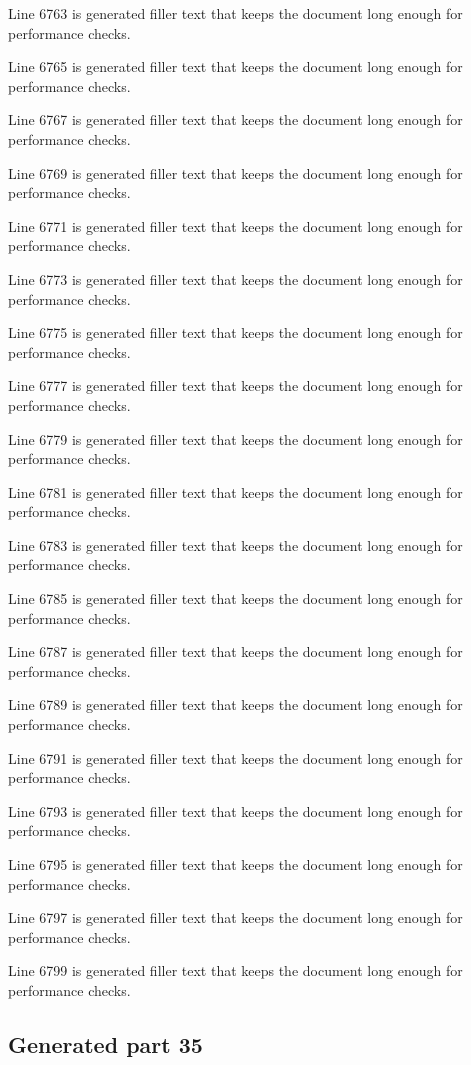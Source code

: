 Line 6763 is generated filler text that keeps the document long enough for performance checks.

Line 6765 is generated filler text that keeps the document long enough for performance checks.

Line 6767 is generated filler text that keeps the document long enough for performance checks.

Line 6769 is generated filler text that keeps the document long enough for performance checks.

Line 6771 is generated filler text that keeps the document long enough for performance checks.

Line 6773 is generated filler text that keeps the document long enough for performance checks.

Line 6775 is generated filler text that keeps the document long enough for performance checks.

Line 6777 is generated filler text that keeps the document long enough for performance checks.

Line 6779 is generated filler text that keeps the document long enough for performance checks.

Line 6781 is generated filler text that keeps the document long enough for performance checks.

Line 6783 is generated filler text that keeps the document long enough for performance checks.

Line 6785 is generated filler text that keeps the document long enough for performance checks.

Line 6787 is generated filler text that keeps the document long enough for performance checks.

Line 6789 is generated filler text that keeps the document long enough for performance checks.

Line 6791 is generated filler text that keeps the document long enough for performance checks.

Line 6793 is generated filler text that keeps the document long enough for performance checks.

Line 6795 is generated filler text that keeps the document long enough for performance checks.

Line 6797 is generated filler text that keeps the document long enough for performance checks.

Line 6799 is generated filler text that keeps the document long enough for performance checks.

\subsection{Generated part 35}

